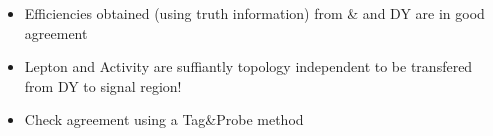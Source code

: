 \documentclass{beamer}
\begin{document}
\begin{frame}
\begin{columns}
\begin{column}{0.33\textwidth}
   \end{column}
  \end{columns}
\begin{itemize}
 \item Efficiencies obtained (using truth information) from \ttbar \& \wpj and DY are in good agreement 
 \item Lepton \pt and Activity are suffiantly topology independent to be transfered from DY to signal region!
 \item Check agreement using a Tag\&Probe method
\end{itemize}
\end{frame}
\end{document}
